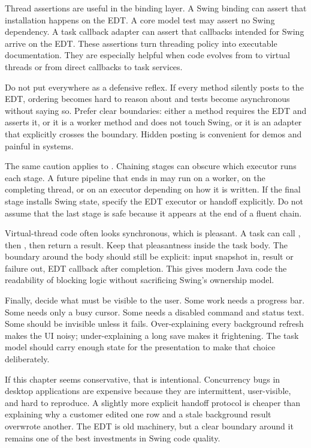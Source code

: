 Thread assertions are useful in the binding layer. A Swing binding can assert that installation happens on the EDT. A core model test may assert no Swing dependency. A task callback adapter can assert that callbacks intended for Swing arrive on the EDT. These assertions turn threading policy into executable documentation. They are especially helpful when code evolves from  to virtual threads or from direct callbacks to task services.

Do not put  everywhere as a defensive reflex. If every method silently posts to the EDT, ordering becomes hard to reason about and tests become asynchronous without saying so. Prefer clear boundaries: either a method requires the EDT and asserts it, or it is a worker method and does not touch Swing, or it is an adapter that explicitly crosses the boundary. Hidden posting is convenient for demos and painful in systems.

The same caution applies to . Chaining stages can obscure which executor runs each stage. A future pipeline that ends in  may run on a worker, on the completing thread, or on an executor depending on how it is written. If the final stage installs Swing state, specify the EDT executor or handoff explicitly. Do not assume that the last stage is safe because it appears at the end of a fluent chain.

Virtual-thread code often looks synchronous, which is pleasant. A task can call , then , then return a result. Keep that pleasantness inside the task body. The boundary around the body should still be explicit: input snapshot in, result or failure out, EDT callback after completion. This gives modern Java code the readability of blocking logic without sacrificing Swing's ownership model.

Finally, decide what must be visible to the user. Some work needs a progress bar. Some needs only a busy cursor. Some needs a disabled command and status text. Some should be invisible unless it fails. Over-explaining every background refresh makes the UI noisy; under-explaining a long save makes it frightening. The task model should carry enough state for the presentation to make that choice deliberately.

If this chapter seems conservative, that is intentional. Concurrency bugs in desktop applications are expensive because they are intermittent, user-visible, and hard to reproduce. A slightly more explicit handoff protocol is cheaper than explaining why a customer edited one row and a stale background result overwrote another. The EDT is old machinery, but a clear boundary around it remains one of the best investments in Swing code quality.

